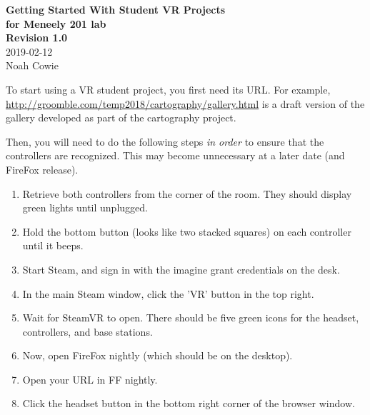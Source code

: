 \documentclass[12pt,letterpaper]{article}
\begin{document}
\begin{center}
\textbf{Getting Started With Student VR Projects\\for Meneely 201 lab\\Revision 1.0}\\2019-02-12\\Noah Cowie\end{center}
\par To start using a VR student project, you first need its URL. For example, 
\underline{\href{http://groomble.com/temp2018/cartography/gallery.html}{http://groomble.com/temp2018/cartography/gallery.html}}
is a draft version of the gallery developed as part of the cartography project.

\par Then, you will need to do the following steps \textit{in order} to ensure that the controllers are recognized. This may become
unnecessary at a later date (and FireFox release).
\begin{enumerate}
	\item Retrieve both controllers from the corner of the room. They should display green lights until unplugged.
	\item Hold the bottom button (looks like two stacked squares) on each controller until it beeps.
	\item Start Steam, and sign in with the imagine grant credentials on the desk. 
	\item In the main Steam window, click the 'VR' button in the top right.
	\item Wait for SteamVR to open. There should be five green icons for the headset, controllers, and base stations.
	\item Now, open FireFox nightly (which should be on the desktop).
	\item Open your URL in FF nightly.
	\item Click the headset button in the bottom right corner of the browser window.
\end{enumerate}
\end{document}
